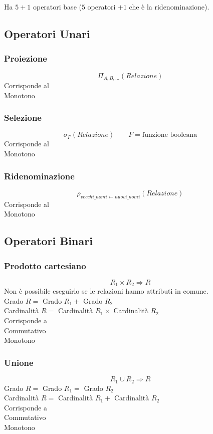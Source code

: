 Ha $5 + 1$ operatori base ($5$ operatori $+ 1$ che \`e la ridenominazione).

\subsection{Operatori Unari}
\subsubsection{Proiezione}
$$\Pi_{A, B, ...}(Relazione)$$
Corrisponde al \\
Monotono

\subsubsection{Selezione}
$$\sigma_{F}(Relazione) \qquad F = \text{funzione booleana}$$
Corrisponde al \\
Monotono

\subsubsection{Ridenominazione}
$$\rho_{vecchi\_nomi \leftarrow nuovi\_nomi}(Relazione)$$
Corrisponde al \\
Monotono

\subsection{Operatori Binari}
\subsubsection{Prodotto cartesiano}
$$R_1 \times R_2 \Rightarrow R$$
Non \`e possibile eseguirlo se le relazioni hanno attributi in comune.\\
Grado $R =$ Grado $R_1 +$ Grado $R_2$\\
Cardinalità $R =$ Cardinalità $R_1 \times$ Cardinalità $R_2$\\
Corrisponde a \\
Commutativo\\
Monotono

\subsubsection{Unione}
$$R_1 \cup R_2 \Rightarrow R$$
Grado $R =$ Grado $R_1 =$ Grado $R_2$\\
Cardinalità $R =$ Cardinalità $R_1 +$ Cardinalità $R_2$\\
Corrisponde a \\
Commutativo\\
Monotono

